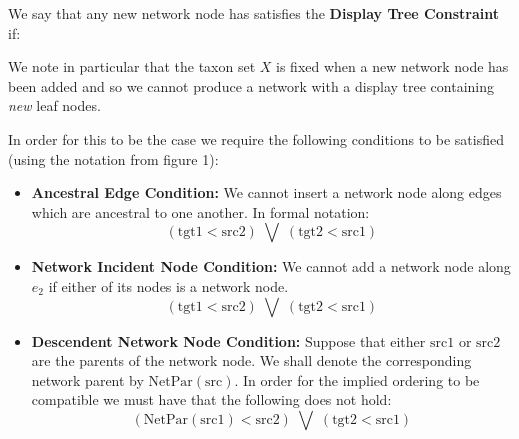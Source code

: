 \documentclass[11pt]{article}
\begin{document}
We say that any new network node has satisfies the \textbf{Display Tree Constraint} if:

\vspace{4mm}
\vspace{4mm}

\noindent We note in particular that the taxon set $X$ is fixed when a new network node has been added and so we cannot produce a network with a display tree containing \textit{new} leaf nodes.

In order for this to be the case we require the following conditions to be satisfied (using the notation from figure 1):

\begin{itemize}

\item \textbf{Ancestral Edge Condition: } We cannot insert a network node along edges which are ancestral to one another. In formal notation:
  \[ (\mathrm{tgt1} < \mathrm{src2})\; \bigvee \; (\mathrm{tgt2} < \mathrm{src1}) \]

\item \textbf{Network Incident Node Condition: } We cannot add a network node along $e_2$ if either of its nodes is a network node.
  \[ (\mathrm{tgt1} < \mathrm{src2})\; \bigvee \; (\mathrm{tgt2} < \mathrm{src1}) \]

\item \textbf{Descendent Network Node Condition: }
Suppose that either $\mathrm{src1}$  or $\mathrm{src2}$ are the parents of the network node. We shall denote the corresponding network parent by $\mathrm{NetPar}(\mathrm{src})$. In order for the implied ordering to be compatible we must have that the following does not hold:
  \[ (\mathrm{NetPar(src1)} < \mathrm{src2})\; \bigvee \; (\mathrm{tgt2} < \mathrm{src1}) \]

\end{itemize}
\end{document}
